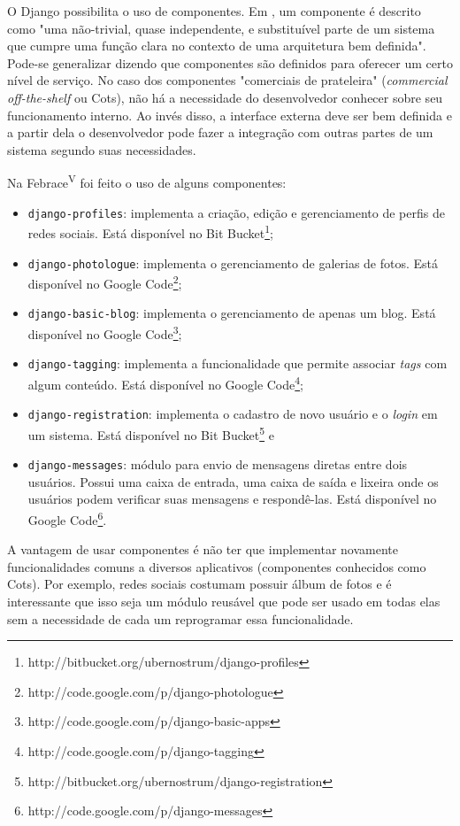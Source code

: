 O Django possibilita o uso de componentes. Em , um componente é descrito como "uma não-trivial, quase independente, e substituível parte de um sistema que cumpre uma função clara no contexto de uma arquitetura bem definida". Pode-se generalizar dizendo que componentes são definidos para oferecer um certo nível de serviço. No caso dos componentes "comerciais de prateleira" (\textit{commercial off-the-shelf} ou Cots), não há a necessidade do desenvolvedor conhecer sobre seu funcionamento interno. Ao invés disso, a interface externa deve ser bem definida e a partir dela o desenvolvedor pode fazer a integração com outras partes de um sistema segundo suas necessidades. 

Na Febrace\textsuperscript{V} foi feito o uso de alguns componentes:

	\begin{itemize}
	  \item{
		\texttt{django-profiles}: implementa a criação, edição e gerenciamento de perfis de redes sociais. Está disponível no Bit Bucket\footnote{http://bitbucket.org/ubernostrum/django-profiles};
	  }
	  \item{
		\texttt{django-photologue}: implementa o gerenciamento de galerias de fotos. Está disponível no Google Code\footnote{http://code.google.com/p/django-photologue};
	  }
	  \item{ 
	    \texttt{django-basic-blog}: implementa o gerenciamento de apenas um blog. Está disponível no Google Code\footnote{http://code.google.com/p/django-basic-apps};
	  }
	  \item{ 
	    \texttt{django-tagging}: implementa a funcionalidade que permite associar \textit{tags} com algum conteúdo. Está disponível no Google Code\footnote{http://code.google.com/p/django-tagging};
	  }
      \item{
        \texttt{django-registration}: implementa o cadastro de novo usuário e o \textit{login} em um sistema. Está disponível no Bit Bucket\footnote{http://bitbucket.org/ubernostrum/django-registration} e
       }
       \item{
        \texttt{django-messages}: módulo para envio de mensagens diretas entre dois usuários. Possui uma caixa de entrada, uma caixa de saída e lixeira onde os usuários podem verificar suas mensagens e respondê-las. Está disponível no Google Code\footnote{http://code.google.com/p/django-messages}.
       }
	\end{itemize} 

A vantagem de usar componentes é não ter que implementar novamente funcionalidades comuns a diversos aplicativos (componentes conhecidos como Cots). Por exemplo, redes sociais costumam possuir álbum de fotos e é interessante que isso seja um módulo reusável que pode ser usado em todas elas sem a necessidade de cada um reprogramar essa funcionalidade.

